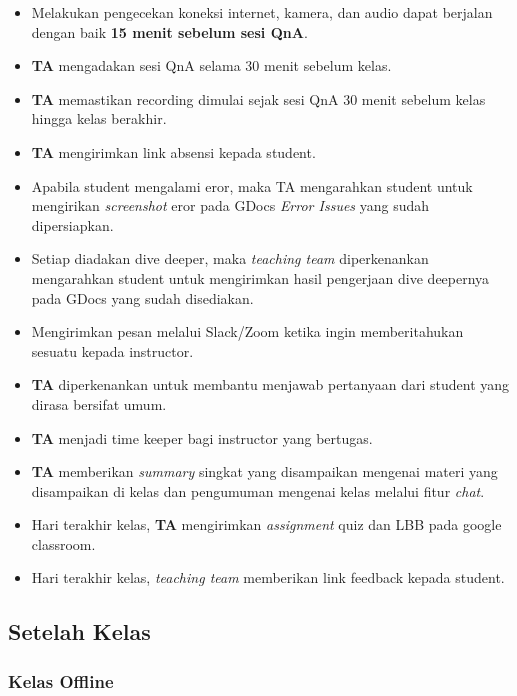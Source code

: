 \documentclass[
]{book}
\providecommand{\tightlist}{%
  \setlength{\itemsep}{0pt}\setlength{\parskip}{0pt}}
\begin{document}
\begin{itemize}
\tightlist
\item
  Melakukan pengecekan koneksi internet, kamera, dan audio dapat berjalan dengan baik \textbf{15 menit sebelum sesi QnA}.
\item
  \textbf{TA} mengadakan sesi QnA selama 30 menit sebelum kelas.
\item
  \textbf{TA} memastikan recording dimulai sejak sesi QnA 30 menit sebelum kelas hingga kelas berakhir.
\item
  \textbf{TA} mengirimkan link absensi kepada student.
\item
  Apabila student mengalami eror, maka TA mengarahkan student untuk mengirikan \emph{screenshot} eror pada GDocs \emph{Error Issues} yang sudah dipersiapkan.
\item
  Setiap diadakan dive deeper, maka \emph{teaching team} diperkenankan mengarahkan student untuk mengirimkan hasil pengerjaan dive deepernya pada GDocs yang sudah disediakan.
\item
  Mengirimkan pesan melalui Slack/Zoom ketika ingin memberitahukan sesuatu kepada instructor.
\item
  \textbf{TA} diperkenankan untuk membantu menjawab pertanyaan dari student yang dirasa bersifat umum.
\item
  \textbf{TA} menjadi time keeper bagi instructor yang bertugas.
\item
  \textbf{TA} memberikan \emph{summary} singkat yang disampaikan mengenai materi yang disampaikan di kelas dan pengumuman mengenai kelas melalui fitur \emph{chat}.
\item
  Hari terakhir kelas, \textbf{TA} mengirimkan \emph{assignment} quiz dan LBB pada google classroom.
\item
  Hari terakhir kelas, \emph{teaching team} memberikan link feedback kepada student.
\end{itemize}

\hypertarget{setelah-kelas}{%
\subsection{Setelah Kelas}\label{setelah-kelas}}

\hypertarget{kelas-offline-2}{%
\subsubsection{Kelas Offline}\label{kelas-offline-2}}
\end{document}
